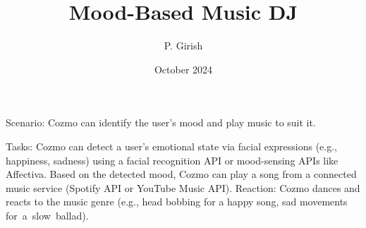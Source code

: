 \documentclass{article}
\title{Mood-Based Music DJ}
\author{P. Girish}
\date{October 2024}
\begin{document}
\maketitle

Scenario: Cozmo can identify the user’s mood and play music to suit it.

Tasks:
Cozmo can detect a user's emotional state via facial expressions (e.g., happiness, sadness) using a facial recognition API or mood-sensing APIs like Affectiva.
Based on the detected mood, Cozmo can play a song from a connected music service (Spotify API or YouTube Music API).
Reaction: Cozmo dances and reacts to the music genre (e.g., head bobbing for a happy song, sad movements for a slow ballad).
\end{document}
